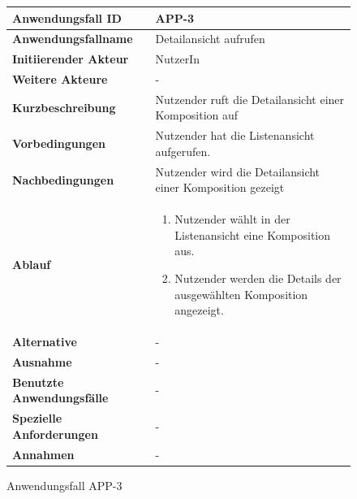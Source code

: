 \begin{figure}[h]
	\centering
	\begin{tabularx}{\textwidth}{ X | X }
		\textbf{Anwendungsfall ID} & APP-3 \\ \hline
		\textbf{Anwendungsfallname} & Detailansicht aufrufen \\ \hline
		\textbf{Initiierender Akteur} & NutzerIn \\ \hline
		\textbf{Weitere Akteure} & -  \\ \hline
		\textbf{Kurzbeschreibung} & Nutzender ruft die Detailansicht einer Komposition auf  \\ \hline
		\textbf{Vorbedingungen} & Nutzender hat die Listenansicht aufgerufen.  \\ \hline
		\textbf{Nachbedingungen} & Nutzender wird die Detailansicht einer Komposition gezeigt \\ \hline
		\textbf{Ablauf} &
		\begin{enumerate}
			\item Nutzender wählt in der Listenansicht eine Komposition aus.
			\item Nutzender werden die Details der ausgewählten Komposition angezeigt.
		\end{enumerate} \\ \hline
		\textbf{Alternative} &
		-  \\ \hline
		\textbf{Ausnahme} &
		- \\ \hline
		\textbf{Benutzte Anwendungsfälle} & - \\ \hline
		\textbf{Spezielle Anforderungen} & - \\ \hline
		\textbf{Annahmen} & -
	\end{tabularx}
	\caption{Anwendungsfall APP-3}
	\label{fig:anwendungsfall-app-tabelle-APP-3}
\end{figure}

\newpage

